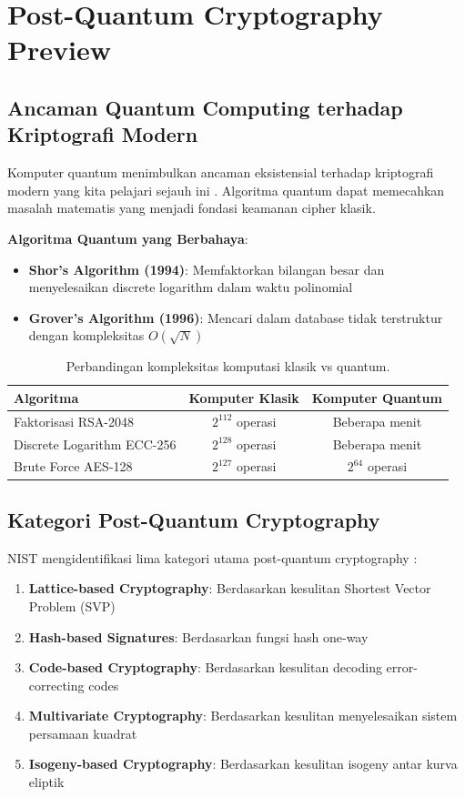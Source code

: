 ﻿\section{Post-Quantum Cryptography Preview}

\subsection{Ancaman Quantum Computing terhadap Kriptografi Modern}

Komputer quantum menimbulkan ancaman eksistensial terhadap kriptografi modern yang kita pelajari sejauh ini \cite{shor1997}. Algoritma quantum dapat memecahkan masalah matematis yang menjadi fondasi keamanan cipher klasik.

\textbf{Algoritma Quantum yang Berbahaya}:
\begin{itemize}
  \item \textbf{Shor's Algorithm (1994)}: Memfaktorkan bilangan besar dan menyelesaikan discrete logarithm dalam waktu polinomial
  \item \textbf{Grover's Algorithm (1996)}: Mencari dalam database tidak terstruktur dengan kompleksitas $O(\sqrt{N})$
\end{itemize}

\begin{table}[htbp]
  \centering
  \small
  \begin{tabular}{lcc}
    \toprule
    Algoritma & Komputer Klasik & Komputer Quantum \\
    \midrule
    Faktorisasi RSA-2048 & $2^{112}$ operasi & Beberapa menit \\
    Discrete Logarithm ECC-256 & $2^{128}$ operasi & Beberapa menit \\
    Brute Force AES-128 & $2^{127}$ operasi & $2^{64}$ operasi \\
    \bottomrule
  \end{tabular}
  \caption{Perbandingan kompleksitas komputasi klasik vs quantum.}
\end{table}

\subsection{Kategori Post-Quantum Cryptography}

NIST mengidentifikasi lima kategori utama post-quantum cryptography \cite{nist2016}:

\begin{enumerate}
  \item \textbf{Lattice-based Cryptography}: Berdasarkan kesulitan Shortest Vector Problem (SVP)
  \item \textbf{Hash-based Signatures}: Berdasarkan fungsi hash one-way
  \item \textbf{Code-based Cryptography}: Berdasarkan kesulitan decoding error-correcting codes
  \item \textbf{Multivariate Cryptography}: Berdasarkan kesulitan menyelesaikan sistem persamaan kuadrat
  \item \textbf{Isogeny-based Cryptography}: Berdasarkan kesulitan isogeny antar kurva eliptik
\end{enumerate}

